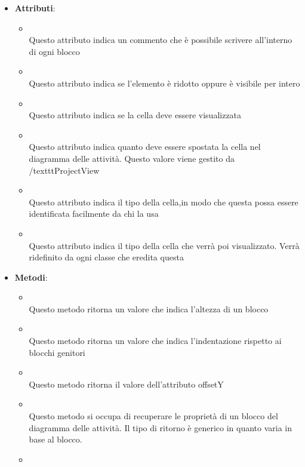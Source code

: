 \begin{itemize}
\begin{itemize}
\end{itemize}
\item \textbf{Attributi}:
\begin{itemize}
\item {}
\\ Questo attributo indica un commento che è possibile scrivere all'interno di ogni blocco
\item {}
\\ Questo attributo indica se l'elemento è ridotto oppure è visibile per intero
\item {}
\\ Questo attributo indica se la cella deve essere visualizzata
\item {}
\\ Questo attributo indica quanto deve essere spostata la cella nel diagramma delle attività. Questo valore viene gestito da /texttt{ProjectView}
\item {}
\\ Questo attributo indica il tipo della cella,in modo  che questa possa essere identificata facilmente da chi la usa
\item {}
\\ Questo attributo indica il tipo della cella che verrà poi visualizzato. Verrà ridefinito da ogni classe che eredita questa
\end{itemize}
\item \textbf{Metodi}:
\begin{itemize}
\item {}
\\ Questo metodo ritorna un valore che indica l'altezza di un blocco
\item {}
\\ Questo metodo ritorna un valore che indica l'indentazione rispetto ai blocchi genitori
\item {}
\\ Questo metodo ritorna il valore dell'attributo offsetY
\item {}
\\ Questo metodo si occupa di recuperare le proprietà di un blocco del diagramma delle attività. Il tipo di ritorno  è generico in quanto varia in base al blocco.
\item {}

\end{itemize}
\end{itemize}
